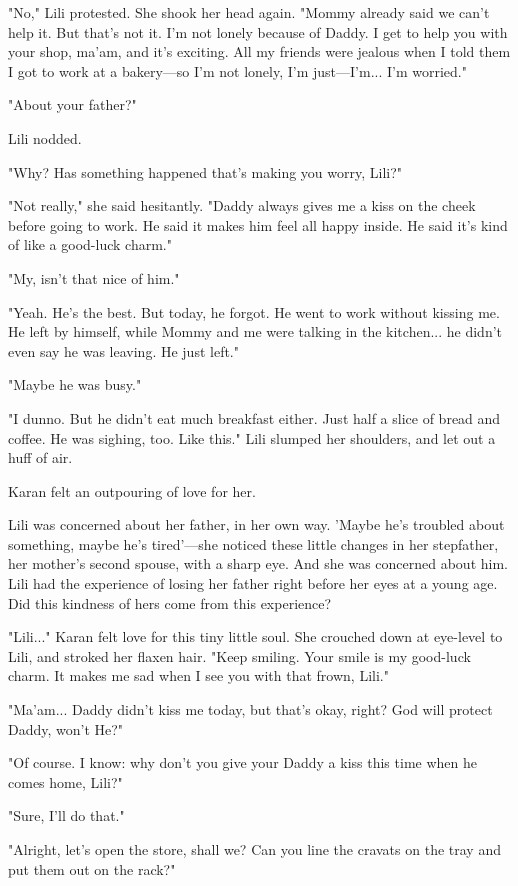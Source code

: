 "No," Lili protested. She shook her head again. "Mommy already said we
can't help it. But that's not it. I'm not lonely because of Daddy. I get
to help you with your shop, ma'am, and it's exciting. All my friends
were jealous when I told them I got to work at a bakery---so I'm not
lonely, I'm just---I'm... I'm worried."

"About your father?"

Lili nodded.

"Why? Has something happened that's making you worry, Lili?"

"Not really," she said hesitantly. "Daddy always gives me a kiss on the
cheek before going to work. He said it makes him feel all happy inside.
He said it's kind of like a good-luck charm."

"My, isn't that nice of him."

"Yeah. He's the best. But today, he forgot. He went to work without
kissing me. He left by himself, while Mommy and me were talking in the
kitchen... he didn't even say he was leaving. He just left."

"Maybe he was busy."

"I dunno. But he didn't eat much breakfast either. Just half a slice of
bread and coffee. He was sighing, too. Like this." Lili slumped her
shoulders, and let out a huff of air.

Karan felt an outpouring of love for her.

Lili was concerned about her father, in her own way. 'Maybe he's
troubled about something, maybe he's tired'---she noticed these little
changes in her stepfather, her mother's second spouse, with a sharp eye.
And she was concerned about him. Lili had the experience of losing her
father right before her eyes at a young age. Did this kindness of hers
come from this experience?

"Lili..." Karan felt love for this tiny little soul. She crouched down
at eye-level to Lili, and stroked her flaxen hair. "Keep smiling. Your
smile is my good-luck charm. It makes me sad when I see you with that
frown, Lili."

"Ma'am... Daddy didn't kiss me today, but that's okay, right? God will
protect Daddy, won't He?"

"Of course. I know: why don't you give your Daddy a kiss this time when
he comes home, Lili?"

"Sure, I'll do that."

"Alright, let's open the store, shall we? Can you line the cravats on
the tray and put them out on the rack?"

